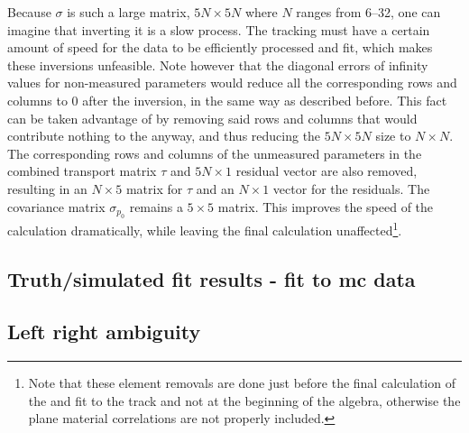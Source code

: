 

Because $\sigma$ is such a large matrix, $5N \times 5N$ where $N$ ranges from \SIrange{6}{32}{}, one can imagine that inverting it is a slow process. The tracking must have a certain amount of speed for the data to be efficiently processed and fit, which makes these inversions unfeasible. Note however that the diagonal errors of infinity values for non-measured parameters would reduce all the corresponding rows and columns to 0 after the inversion, in the same way as described before. This fact can be taken advantage of by removing said rows and columns that would contribute nothing to the \chisq anyway, and thus reducing the $5N \times 5N$ size to $N \times N$. The corresponding rows and columns of the unmeasured parameters in the combined transport matrix $\tau$ and $5N \times 1$ residual vector are also removed, resulting in an $N \times 5$ matrix for $\tau$ and an $N \times 1$ vector for the residuals. The covariance matrix $\sigma_{p_{0}}$ remains a $5 \times 5$ matrix. This improves the speed of the \chisq calculation dramatically, while leaving the final calculation unaffected\footnote{Note that these element removals are done just before the final calculation of the \chisq and fit to the track and not at the beginning of the algebra, otherwise the plane material correlations are not properly included.}. 





\clearpage %



\subsection{Truth/simulated fit results - fit to mc data}



\subsection{Left right ambiguity}
\label{sub:leftright}



